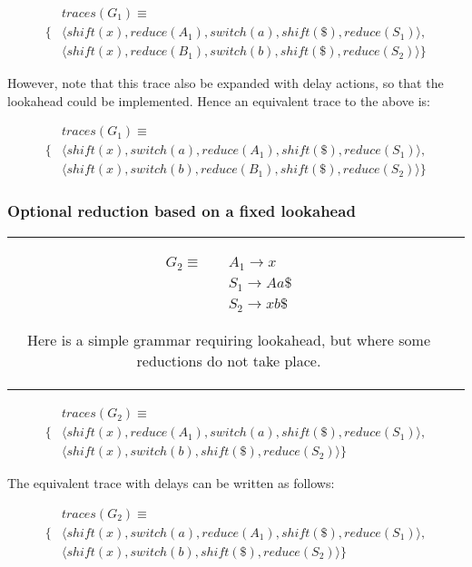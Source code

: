 \documentclass[11pt]{article}
\begin{document}
\parbox{.3\textwidth}{\begin{align*}
&traces(G_1) \equiv \\
\{ & \langle shift(x), reduce(A_1), switch(a), shift(\$), reduce(S_1) \rangle,\\
   & \langle shift(x), reduce(B_1), switch(b), shift(\$), reduce(S_2) \rangle \}
\end{align*}}

However, note that this trace also be expanded with delay actions, so that the lookahead could be implemented. Hence an equivalent trace to the above is:

\parbox{.3\textwidth}{\begin{align*}
&traces(G_1) \equiv \\
\{ & \langle shift(x), switch(a), reduce(A_1), shift(\$), reduce(S_1) \rangle, \\
   & \langle shift(x), switch(b), reduce(B_1), shift(\$), reduce(S_2) \rangle \}
\end{align*}}

\subsubsection{Optional reduction based on a fixed lookahead}
\begin{tabular}[t]{cl}
\parbox{.3\textwidth}{
\begin{align*}
G_2 \equiv \quad & A_1 \rightarrow x\\
                 & S_1 \rightarrow A a \$\\
                 & S_2 \rightarrow x b \$
\end{align*}}
\parbox{.8\textwidth}{Here is a simple grammar requiring lookahead, but where some reductions do not take place.}
\end{tabular}

\parbox{.3\textwidth}{\begin{align*}
&traces(G_2) \equiv \\
\{ & \langle shift(x), reduce(A_1), switch(a), shift(\$), reduce(S_1) \rangle,\\
   & \langle shift(x), switch(b), shift(\$), reduce(S_2) \rangle \}
\end{align*}}

The equivalent trace with delays can be written as follows:

\parbox{.3\textwidth}{\begin{align*}
&traces(G_2) \equiv \\
\{ & \langle shift(x), switch(a), reduce(A_1), shift(\$), reduce(S_1) \rangle,\\
   & \langle shift(x), switch(b), shift(\$), reduce(S_2) \rangle \}
\end{align*}}
\end{document}
